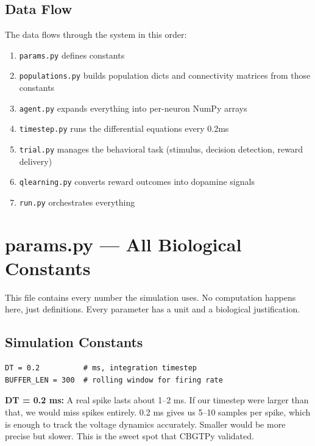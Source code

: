 \documentclass[11pt,a4paper]{article}
\begin{document}
\subsection{Data Flow}
The data flows through the system in this order:
\begin{enumerate}
    \item \texttt{params.py} defines constants
    \item \texttt{populations.py} builds population dicts and connectivity matrices from those constants
    \item \texttt{agent.py} expands everything into per-neuron NumPy arrays
    \item \texttt{timestep.py} runs the differential equations every 0.2ms
    \item \texttt{trial.py} manages the behavioral task (stimulus, decision detection, reward delivery)
    \item \texttt{qlearning.py} converts reward outcomes into dopamine signals
    \item \texttt{run.py} orchestrates everything
\end{enumerate}

\newpage
\section{params.py --- All Biological Constants}

This file contains every number the simulation uses. No computation happens here, just definitions. Every parameter has a unit and a biological justification.

\subsection{Simulation Constants}

\begin{lstlisting}
DT = 0.2          # ms, integration timestep
BUFFER_LEN = 300  # rolling window for firing rate
\end{lstlisting}

\textbf{DT = 0.2 ms:} A real spike lasts about 1--2 ms. If our timestep were larger than that, we would miss spikes entirely. 0.2 ms gives us 5--10 samples per spike, which is enough to track the voltage dynamics accurately. Smaller would be more precise but slower. This is the sweet spot that CBGTPy validated.
\end{document}
